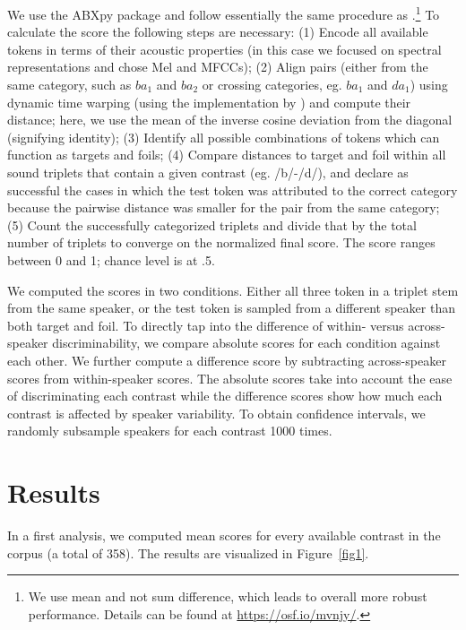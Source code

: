 \documentclass[10pt,letterpaper]{article}
\begin{document}
We use the ABXpy package \cite{ABXpy} and follow essentially the same procedure as .\footnote{We use mean and not sum difference, which leads to overall more robust performance. Details can be found at \url{https://osf.io/mvnjy/}.} To calculate the score the following steps are necessary: 
(1) Encode all available tokens in terms of their acoustic properties (in this case we focused on spectral representations and chose Mel and MFCCs); (2) Align pairs (either from the same category, such as $ba_1$ and $ba_2$ or crossing categories, eg. $ba_1$ and $da_1$) using dynamic time warping (using the implementation by ) and compute their distance; here, we use the mean of the inverse cosine deviation from the diagonal (signifying identity); (3) Identify all possible combinations of tokens which can function as targets and foils; (4) Compare distances to target and foil within all sound triplets that contain a given contrast (eg. /b/-/d/), and declare as successful the cases in which the test token was attributed to the correct category because the pairwise distance was smaller for the pair from the same category; (5) Count the successfully categorized triplets and divide that by the total number of triplets to converge on the normalized final score. The score ranges between 0 and 1; chance level is at .5. 

We computed the scores in two conditions. Either all three token in a triplet stem from the same speaker, or the test token is sampled from a different speaker than both target and foil. 
To directly tap into the difference of within- versus across-speaker discriminability, we compare absolute scores for each condition against each other. We further compute a difference score by subtracting across-speaker scores from within-speaker scores. The absolute scores take into account the ease of discriminating each contrast while the difference scores show how much each contrast is affected by speaker variability. To obtain confidence intervals, we randomly subsample speakers for each contrast 1000 times. 

\section{Results}

In a first analysis, we computed mean scores for every available contrast in the corpus (a total of 358). The results are visualized in Figure~\ref{fig1}.
\end{document}
